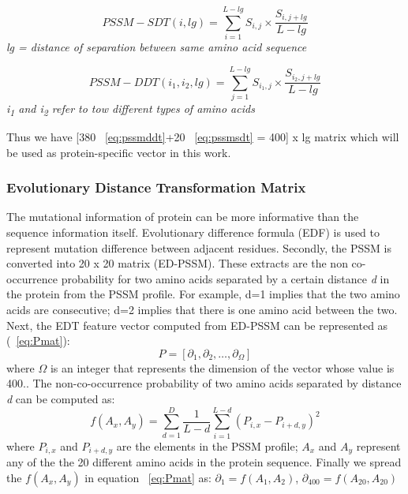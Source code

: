   \begin{equation}[h]
    PSSM-SDT(i,lg) = \sum_{i=1}^{L-lg} S_{i,j} \times \frac{ S_{i,j+lg} }{L-lg} 
    \label{eq:pssmsdt}
  \end{equation}
  \textit{\center lg =  distance of separation between same amino acid sequence}
  
  \begin{equation}[h]
    PSSM-DDT(i_1,i_2, lg) = \sum_{j=1}^{L-lg} S_{i_1,j} \times \frac{ S_{i_2,j+lg} }{ L-lg} 
    \label{eq:pssmddt}
  \end{equation}
  \textit{\centering i\textsubscript{1} and i\textsubscript{2} refer to tow different types of amino acids}
  
  Thus we have [380 ~\eqref{eq:pssmddt}+20 ~\eqref{eq:pssmsdt} = 400] x lg matrix which will be used as protein-specific vector in this work.
  
  \subsubsection{Evolutionary Distance Transformation Matrix}
  The mutational information of protein can be more informative than the sequence information itself\cite{Zhang2014}. Evolutionary difference formula (EDF) is used to represent mutation difference between adjacent residues. Secondly, the PSSM is converted into 20 x 20 matrix (ED-PSSM). These extracts are the non co-occurrence probability for two amino acids separated by a certain distance \textit{d} in the protein from the PSSM profile. For example, d=1 implies that the two amino acids are consecutive; d=2 implies that there is one amino acid between the two. Next, the EDT feature vector computed from ED-PSSM can be represented as (~\ref{eq:Pmat}): 
  \begin{equation}
    \label{eq:Pmat}
    P = [ \partial_1 ,\partial_2, \dots, \partial_\Omega]
  \end{equation}
  where $\Omega$ is an integer that represents the dimension of the vector whose value is 400.. The non-co-occurrence probability of two amino acids separated by distance \textit{d} can be computed as:
  \begin{equation}
    f(A_x,A_y) = \sum_{d=1}^{D} \frac{1}{L-d} \sum_{i=1}^{L-d} (P_{i,x} - P_{i+d,y})^2
    \label{eq:edt}
  \end{equation}
  where $P_{i,x}$ and $P_{i+d,y}$ are the elements in the PSSM profile; $A_x$ and $A_y$ represent any of the the 20 different amino acids in the protein sequence. Finally we spread the $f(A_x,A_y)$ in equation ~\ref{eq:Pmat} as:
  $ \partial_1 = f(A_1,A_2) $, 
  $ \partial_{400} = f(A_{20}, A_{20}) $
  
